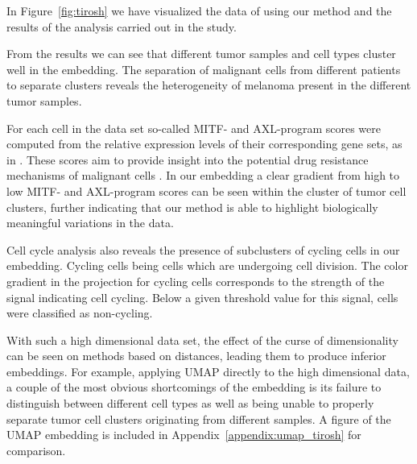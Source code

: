 In Figure~\ref{fig:tirosh} we have visualized the data of \cite{tirosh} using our method and the results of the analysis carried out in the study.

From the results we can see that different tumor samples and cell types cluster well in the embedding. The separation of malignant cells from different patients to separate clusters reveals the heterogeneity of melanoma present in the different tumor samples.

For each cell in the data set so-called MITF- and AXL-program scores were computed from the relative expression levels of their corresponding gene sets, as in \cite{tirosh}. These scores aim to provide insight into the potential drug resistance mechanisms of malignant cells \cite{mitf, mitf_axl}. In our embedding a clear gradient from high to low MITF- and AXL-program scores can be seen within the cluster of tumor cell clusters, further indicating that our method is able to highlight biologically meaningful variations in the data.

Cell cycle analysis also reveals the presence of subclusters of cycling cells in our embedding. Cycling cells being cells which are undergoing cell division. The color gradient in the projection for cycling cells corresponds to the strength of the signal indicating cell cycling. Below a given threshold value for this signal, cells were classified as non-cycling.

With such a high dimensional data set, the effect of the curse of dimensionality can be seen on methods based on distances, leading them to produce inferior embeddings. For example, applying UMAP directly to the high dimensional data, a couple of the most obvious shortcomings of the embedding is its failure to distinguish between different cell types as well as being unable to properly separate tumor cell clusters originating from different samples. A figure of the UMAP embedding is included in Appendix~\ref{appendix:umap_tirosh} for comparison.

